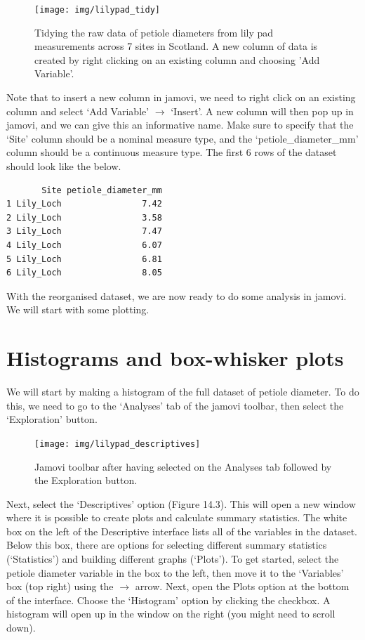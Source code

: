 \documentclass[
]{scrbook}
\begin{document}
\begin{figure}
\texttt{[image: img/lilypad\_tidy]} \caption{Tidying the raw data of petiole diameters from lily pad measurements across 7 sites in Scotland. A new column of data is created by right clicking on an existing column and choosing 'Add Variable'.}\label{fig:unnamed-chunk-49}
\end{figure}

Note that to insert a new column in jamovi, we need to right click on an existing column and select `Add Variable' \(\to\) `Insert'.
A new column will then pop up in jamovi, and we can give this an informative name.
Make sure to specify that the `Site' column should be a nominal measure type, and the `petiole\_diameter\_mm' column should be a continuous measure type.
The first 6 rows of the dataset should look like the below.

\begin{verbatim}
       Site petiole_diameter_mm
1 Lily_Loch                7.42
2 Lily_Loch                3.58
3 Lily_Loch                7.47
4 Lily_Loch                6.07
5 Lily_Loch                6.81
6 Lily_Loch                8.05
\end{verbatim}

With the reorganised dataset, we are now ready to do some analysis in jamovi.
We will start with some plotting.

\hypertarget{histograms-and-box-whisker-plots}{%
\section{Histograms and box-whisker plots}\label{histograms-and-box-whisker-plots}}

We will start by making a histogram of the full dataset of petiole diameter.
To do this, we need to go to the `Analyses' tab of the jamovi toolbar, then select the `Exploration' button.

\begin{figure}
\texttt{[image: img/lilypad\_descriptives]} \caption{Jamovi toolbar after having selected on the Analyses tab followed by the Exploration button.}\label{fig:unnamed-chunk-51}
\end{figure}

Next, select the `Descriptives' option (Figure 14.3).
This will open a new window where it is possible to create plots and calculate summary statistics.
The white box on the left of the Descriptive interface lists all of the variables in the dataset.
Below this box, there are options for selecting different summary statistics (`Statistics') and building different graphs (`Plots').
To get started, select the petiole diameter variable in the box to the left, then move it to the `Variables' box (top right) using the \(\to\) arrow.
Next, open the Plots option at the bottom of the interface.
Choose the `Histogram' option by clicking the checkbox.
A histogram will open up in the window on the right (you might need to scroll down).
\end{document}
